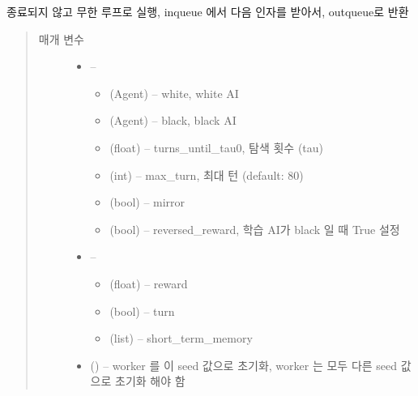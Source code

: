 \documentclass[letterpaper,10pt,english]{sphinxmanual}
\begin{document}
\begin{fulllineitems}
\label{\detokenize{agents.self_learning:agents.self_learning.agent.play_game}}
종료되지 않고 무한 루프로 실행,
inqueue 에서 다음 인자를 받아서, outqueue로 반환
\begin{quote}\begin{description}
\item[{매개 변수}] \leavevmode\begin{itemize}
\item {} 
 -- \begin{itemize}
\item {} 
(Agent) -- white, white AI

\item {} 
(Agent) -- black, black AI

\item {} 
(float) -- turns\_until\_tau0, 탐색 횟수 (tau)

\item {} 
(int) -- max\_turn, 최대 턴 (default: 80)

\item {} 
(bool) -- mirror

\item {} 
(bool) -- reversed\_reward, 학습 AI가 black 일 때 True 설정

\end{itemize}


\item {} 
 -- \begin{itemize}
\item {} 
(float) -- reward

\item {} 
(bool) -- turn

\item {} 
(list) -- short\_term\_memory

\end{itemize}


\item {} 
 () -- worker 를 이 seed 값으로 초기화, worker 는 모두 다른 seed 값으로 초기화 해야 함

\end{itemize}

\end{description}\end{quote}

\end{fulllineitems}
\end{document}
